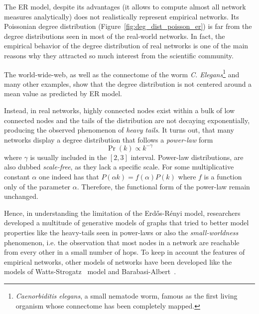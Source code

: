 The ER model, despite its advantages (it allows to compute almost all network measures analytically) does not realistically represent empirical networks. Its Poissonian degree distribution (Figure~\ref{fig:deg_dist_poisson_er}) is far from the degree distributions seen in most of the real-world networks. In fact, the empirical behavior of the degree distribution of real networks is one of the main reasons why they attracted so much interest from the scientific community.

The world-wide-web, as well as the connectome of the worm \emph{C. Elegans}\footnote{\emph{Caenorbiditis elegans}, a small nematode worm, famous as the first living organism whose connectome has been completely mapped.} and many other examples, show that the degree distribution is not centered around a mean value as predicted by ER model. 


Instead, in real networks, highly connected nodes exist within a bulk of low connected nodes and the tails of the distribution are not decaying exponentially, producing the observed phenomenon of \emph{heavy tails}.
It turns out, that many networks display a degree distribution that follows a \emph{power-law} form
\begin{equation}
\Pr(k) \propto k^{-\gamma}
\end{equation}
where $\gamma$ is usually included in the $[2,3]$ interval.
Power-law distributions, are also dubbed \emph{scale-free}, as they lack a specific scale. For some multiplicative constant $\alpha$ one indeed has that $P(\alpha k)=f(\alpha)P(k)$ where $f$ is a function only of the parameter $\alpha$. Therefore, the functional form of the power-law remain unchanged.

Hence, in understanding the limitation of the Erd\H{o}s-Rényi model, researchers developed a multitude of generative models of graphs that tried to better model properties like the heavy-tails seen in power-laws or also the \emph{small-worldness} phenomenon, i.e. the observation that most nodes in a network are reachable from every other in a small number of hops.
To keep in account the features of empirical networks, other models of networks have been developed like the models of Watts-Strogatz~\cite{Watts1998} model and Barabasi-Albert~\cite{Barabasi1999}.

